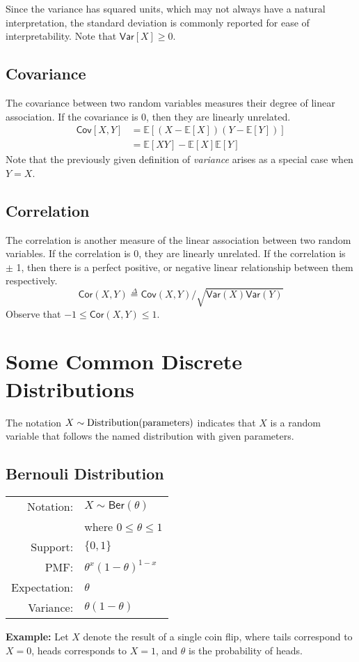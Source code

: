 \documentclass[twoside]{article}
\def\Cor{\textsf{Cor}} %
\def\Cov{\textsf{Cov}} %
\def\Ber{\textsf{Ber}} %
\def\defn{\stackrel{\Delta}{=}} %
\def\Var{\textsf{Var}} %
\def\tn#1{\textnormal{#1}} %
\begin{document}
Since the variance has squared units, which may not always have a natural interpretation, the standard deviation is commonly reported for ease of interpretability. Note that $\Var[X] \geq 0$.

\subsection*{Covariance}
The covariance between two random variables measures their degree of linear association. If the covariance is 0, then they are linearly unrelated. 
\begin{align*}
\Cov[X,Y] &= \mathbb{E}[(X-\mathbb{E}[X])(Y-\mathbb{E}[Y])]\\
&= \mathbb{E}[XY] - \mathbb{E}[X]\mathbb{E}[Y]
\end{align*}
Note that the previously given definition of \emph{variance} arises as a special case when $Y = X$. 

\subsection*{Correlation}
The correlation is another measure of the linear association between two random variables. If the correlation is 0, they are linearly unrelated. If the correlation is $\pm$ 1, then there is a perfect positive, or negative linear relationship between them respectively.
$$\Cor(X,Y) \defn \Cov(X,Y) / \sqrt{\Var(X)\Var(Y)} $$
Observe that $-1 \leq \Cor(X,Y) \leq 1$.

\section{Some Common Discrete Distributions}
The notation $X \sim \tn{Distribution}(\tn{parameters})$ indicates that $X$ is a random variable that follows the named distribution with given parameters.

\subsection*{Bernouli Distribution}
\begin{flushleft}
\def\arraystretch{1.1}
\begin{tabular}{rl}
Notation: & $X\sim \Ber(\theta)$\\
& where $0\leq \theta \leq 1$\\
Support:  & $\{0,1\}$\\ 
PMF:   & $\theta^x(1 - \theta)^{1-x}$\\ 
Expectation:  & $\theta$\\
Variance:  &  $\theta(1-\theta)$
\end{tabular}
\end{flushleft}
{\bf Example:} Let $X$ denote the result of a single coin flip,
where tails correspond to $X=0$, heads corresponds to $X=1$, and $\theta$ is the probability of heads.
\end{document}

